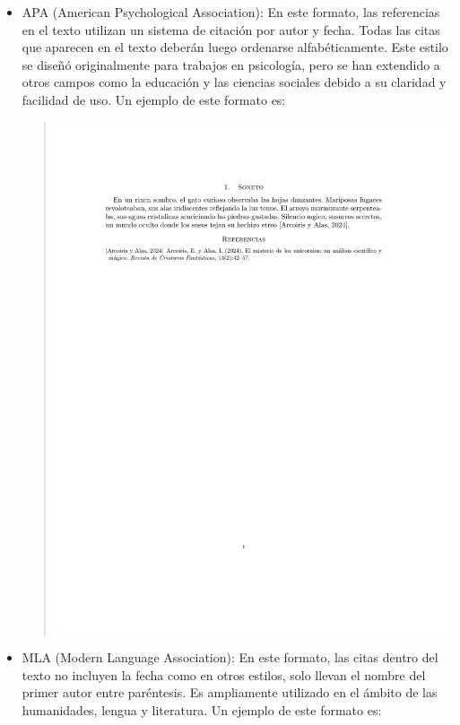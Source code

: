 \begin{naranja}
\begin{itemize}
    \item APA (American Psychological Association): En este formato, las referencias en el texto utilizan un sistema de citación por autor y fecha. Todas las citas que aparecen en el texto deberán luego ordenarse alfabéticamente. Este estilo se diseñó originalmente para trabajos en psicología, pero se han extendido a otros campos como la educación y las ciencias sociales debido a su claridad y facilidad de uso. Un ejemplo de este formato es:
    \begin{quote}
        \includegraphics[scale=0.6, trim={2cm 20cm 3cm 3cm}, clip]{images/apa.pdf}
    \end{quote}
    \item MLA (Modern Language Association): En este formato, las citas dentro del texto no incluyen la fecha como en otros estilos, solo llevan el nombre del primer autor entre paréntesis. Es ampliamente utilizado en el ámbito de las humanidades, lengua y literatura. Un ejemplo de este formato es:

\end{itemize}
\end{naranja}
